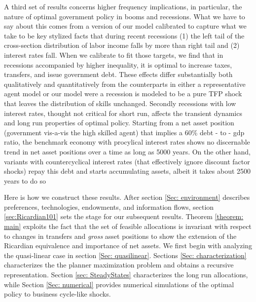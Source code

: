 \documentclass[thmsb,11pt]{article}
\begin{document}
A third set of results concerns higher frequency implications, in particular,  the nature of  optimal government policy in booms and recessions.
What we have to say about this comes from a  version of our model calibrated to capture what we take to be
key  stylized facts  that during recent recessions  (1) the left tail of the cross-section distribution of labor income falls by more than right tail and (2) interest rates fall. When we calibrate  to fit those targets, we find that in recessions accompanied by higher inequality, it is  optimal to increase taxes, transfers, and issue
government debt. %
These effects differ substantially both qualitatively and quantitatively from the counterparts in either a representative agent model or our model were a  recession is modeled to be a pure TFP shock that leaves the distribution of skills unchanged. Secondly recessions with low interest rates, thought not critical for short run, affects the transient dynamics and long run properties of optimal policy. Starting from a net asset position (government vis-a-vis the high skilled agent) that implies a 60\% debt - to - gdp ratio, the benchmark economy with procylical interest rates shows no discernable trend in net asset positions over a time as long as 5000 years. On the other hand, variants with countercyclical interest rates  (that effectively ignore discount factor shocks) repay this debt and starts accumulating assets, albeit it takes about 2500 years to do so



Here is how we construct these results.
After section \ref{Sec: environment} describes preferences, technologies, endowments, and
information flows, section
\ref{sec:Ricardian101} sets the stage for our subsequent results. Theorem \ref{theorem: main}
exploits the fact that the set of feasible allocations is invariant with respect to changes in transfers and \emph{gross} asset positions to show the extension of the Ricardian equivalence and importance of net assets. We first begin with analyzing the quasi-linear case in section \ref{Sec: quasilinear}. Sections \ref{Sec: characterization} characterizes the the planner maximization problem and obtains a recursive representation. Section \ref{sec: SteadyStates} characterizes the long run allocations, while Section \ref{Sec: numerical} provides numerical simulations of the optimal policy to business cycle-like shocks.
\end{document}
